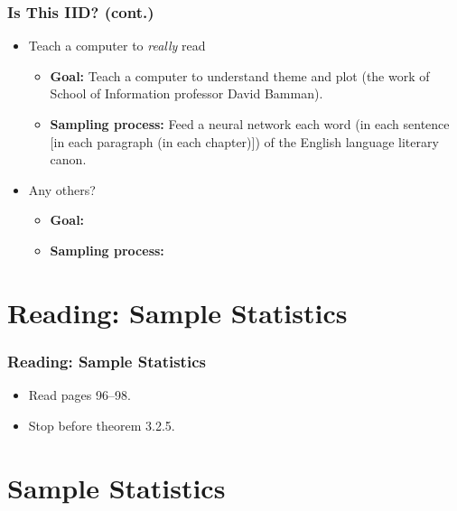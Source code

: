 \documentclass[12pt, block=fill]{beamer}
\begin{document}
\begin{frame}
  \frametitle{Is This IID? (cont.)}
  \begin{itemize}
    \item Teach a computer to \textit{really} read
    \begin{itemize}
    \item \textbf{Goal:} Teach a computer to understand theme and plot
      (the work of School of Information professor David Bamman).
    \item \textbf{Sampling process:} Feed a neural network each word
      (in each sentence [in each paragraph (in each chapter)]) of the English
      language literary canon.
    \end{itemize}
  \item Any others?
    \begin{itemize}
    \item \textbf{Goal:} 
    \item \textbf{Sampling process:} 
    \end{itemize}
  \end{itemize}
\end{frame}

\section{Reading: Sample Statistics}

\begin{frame}
  \frametitle{Reading: Sample Statistics}
  \begin{itemize}
  \item Read pages 96–98.
  \item Stop before theorem 3.2.5.
  \end{itemize} 
\end{frame}

\section{Sample Statistics}
\end{document}
